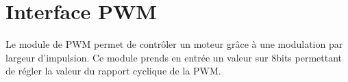 \section{Interface PWM}
Le module de PWM permet de contrôler un moteur grâce à une modulation par largeur d'impulsion. Ce module prends en entrée un valeur sur 8bits permettant de régler la valeur
du rapport cyclique de la PWM.